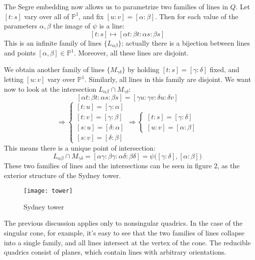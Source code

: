 \documentclass[12 pt]{article}
\newcommand{\Proj}{\mathbb{P}}
\begin{document}
The Segre embedding now allows us to parametrize two families of lines in $Q$. Let $[t:s]$ vary over all of $\Proj^1$, and fix $[u:v] =
[\alpha: \beta]$. Then for each value of the parameters $\alpha, \beta$ the image of $\psi$ is a line:
\[     [t:s] \mapsto [\alpha t : \beta t: \alpha s: \beta s]     \]
This is an infinite family of lines $\{L_{\alpha \beta}\}$; actually there is a bijection between lines and points $[\alpha, \beta] \in \Proj^1$.
Moreover, all these lines are disjoint.

We obtain another family of lines $\{M_{\gamma \delta}\}$ by holding $[t:s] = [\gamma : \delta]$ fixed, and letting $[u:v]$ vary over 
$\Proj^1$. Similarly, all lines in this family are disjoint. We want now to look at the intersection $L_{\alpha \beta} \cap M_{\gamma \delta}$:
\[      [\alpha t : \beta t : \alpha s : \beta s] = [\gamma u : \gamma v : \delta u : \delta v]       \]
\[     \Rightarrow \left\{ \begin{array} {c}  {[t:u] = [\gamma : \alpha]} \\ {[t:v] = [\gamma : \beta]} \\ {[s:u] = [\delta : \alpha]} \\ 
	{[s:v] = [\delta : \beta]} \end{array} \right.  \Rightarrow  \left\{ \begin{array} {c}  {[t:s] = [\gamma : \delta]} \\  
	{[u:v] = [\alpha : \beta]} \end{array} \right.  \]
This means there is a unique point of intersection:
 \[ L_{\alpha \beta} \cap M_{\gamma \delta} = [\alpha \gamma : \beta \gamma : \alpha \delta : \beta \delta] = \psi \big( [\gamma : \delta] ,
 [\alpha : \beta] \big)  \]
These two families of lines and the intersections can be seen in figure 2, as the exterior structure of the Sydney tower.

\begin{figure}[h!]
  \caption{Sydney tower}
  \centering
    \texttt{[image: tower]}
\end{figure}

The previous discussion applies only to nonsingular quadrics. In the case of the singular cone, for example, it's easy to see that
the two families of lines collapse into a single family, and all lines intersect at the vertex of the cone. The reducible quadrics consist of planes,
which contain lines with arbitrary orientations.
\end{document}

